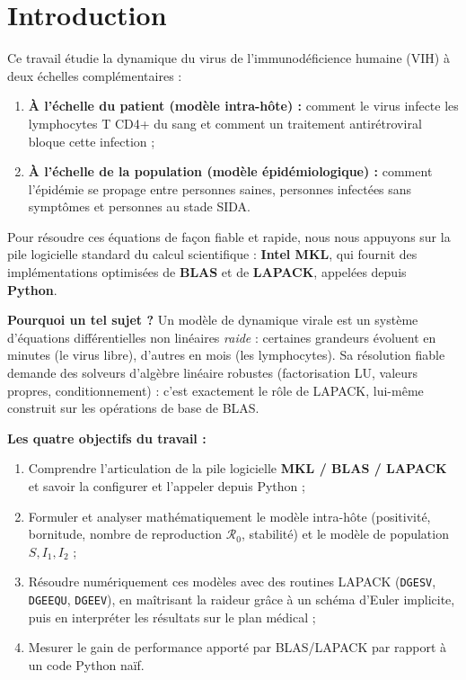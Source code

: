 \documentclass[11pt,a4paper]{report}
\theoremstyle{plain}
\theoremstyle{definition}
\theoremstyle{remark}
\newcommand{\Rzero}{\mathcal{R}_0}
\begin{document}
\chapter*{Introduction}

\begin{cadreconcept}
Ce travail étudie la dynamique du virus de l'immunodéficience humaine (VIH) à deux échelles complémentaires :
\begin{enumerate}
    \item \textbf{À l'échelle du patient (modèle intra-hôte) :} comment le virus infecte les lymphocytes T CD4+ du sang et comment un traitement antirétroviral bloque cette infection ;
    \item \textbf{À l'échelle de la population (modèle épidémiologique) :} comment l'épidémie se propage entre personnes saines, personnes infectées sans symptômes et personnes au stade SIDA.
\end{enumerate}
Pour résoudre ces équations de façon fiable et rapide, nous nous appuyons sur la pile logicielle standard du calcul scientifique : \textbf{Intel MKL}, qui fournit des implémentations optimisées de \textbf{BLAS} et de \textbf{LAPACK}, appelées depuis \textbf{Python}.
\end{cadreconcept}

\vspace{0.3cm}
\noindent\textbf{Pourquoi un tel sujet ?}
Un modèle de dynamique virale est un système d'équations différentielles non linéaires \emph{raide} : certaines grandeurs évoluent en minutes (le virus libre), d'autres en mois (les lymphocytes). Sa résolution fiable demande des solveurs d'algèbre linéaire robustes (factorisation LU, valeurs propres, conditionnement) : c'est exactement le rôle de LAPACK, lui-même construit sur les opérations de base de BLAS.

\vspace{0.3cm}
\noindent\textbf{Les quatre objectifs du travail :}
\begin{enumerate}
    \item Comprendre l'articulation de la pile logicielle \textbf{MKL / BLAS / LAPACK} et savoir la configurer et l'appeler depuis Python ;
    \item Formuler et analyser mathématiquement le modèle intra-hôte (positivité, bornitude, nombre de reproduction $\Rzero$, stabilité) et le modèle de population $S,I_1,I_2$ ;
    \item Résoudre numériquement ces modèles avec des routines LAPACK (\texttt{DGESV}, \texttt{DGEEQU}, \texttt{DGEEV}), en maîtrisant la raideur grâce à un schéma d'Euler implicite, puis en interpréter les résultats sur le plan médical ;
    \item Mesurer le gain de performance apporté par BLAS/LAPACK par rapport à un code Python naïf.
\end{enumerate}
\end{document}
